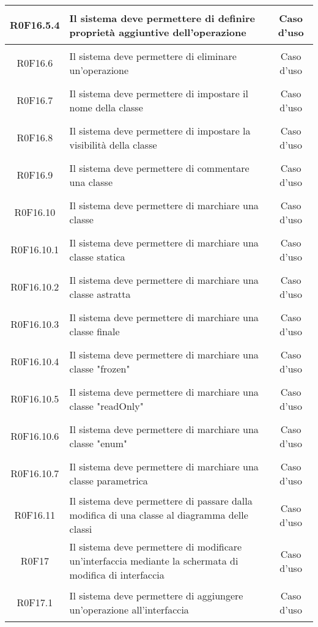 \documentclass[../AnalisiDeiRequisiti.tex]{subfiles}
\begin{document}
\begin{longtable}{|c|>{\centering}p{7cm}|c|}
	\hypertarget{R0F16.5.4}{R0F16.5.4} & Il sistema deve permettere di definire proprietà aggiuntive dell'operazione & Caso d'uso \\ \hline
	\hypertarget{R0F16.6}{R0F16.6} & Il sistema deve permettere di eliminare un'operazione  & Caso d'uso \\ \hline
	\hypertarget{R0F16.7}{R0F16.7} & Il sistema deve permettere di impostare il nome della classe & Caso d'uso \\ \hline
	\hypertarget{R0F16.8}{R0F16.8} & Il sistema deve permettere di impostare la visibilità della classe & Caso d'uso \\ \hline
	\hypertarget{R0F16.9}{R0F16.9} & Il sistema deve permettere di commentare una classe & Caso d'uso \\ \hline
	\hypertarget{R0F16.10}{R0F16.10} & Il sistema deve permettere di marchiare una classe & Caso d'uso \\ \hline
	\hypertarget{R0F16.10.1}{R0F16.10.1} & Il sistema deve permettere di marchiare una classe statica & Caso d'uso \\ \hline
	\hypertarget{R0F16.10.2}{R0F16.10.2} & Il sistema deve permettere di marchiare una classe astratta & Caso d'uso \\ \hline
	\hypertarget{R0F16.10.3}{R0F16.10.3} & Il sistema deve permettere di marchiare una classe finale & Caso d'uso \\ \hline
	\hypertarget{R0F16.10.4}{R0F16.10.4} & Il sistema deve permettere di marchiare una classe "frozen" & Caso d'uso \\ \hline
	\hypertarget{R0F16.10.5}{R0F16.10.5} & Il sistema deve permettere di marchiare una classe "readOnly" & Caso d'uso \\ \hline
	\hypertarget{R0F16.10.6}{R0F16.10.6} & Il sistema deve permettere di marchiare una classe "enum" & Caso d'uso \\ \hline
	\hypertarget{R0F16.10.7}{R0F16.10.7} & Il sistema deve permettere di marchiare una classe parametrica & Caso d'uso \\ \hline
	\hypertarget{R0F16.11}{R0F16.11} & Il sistema deve permettere di passare dalla modifica di una classe al diagramma delle classi	 & Caso d'uso \\ \hline
	\hypertarget{R0F17}{R0F17} & Il sistema deve permettere di modificare un'interfaccia mediante la schermata di modifica di interfaccia & Caso d'uso \\ \hline
	\hypertarget{R0F17.1}{R0F17.1} & Il sistema deve permettere di aggiungere un'operazione all'interfaccia & Caso d'uso \\ \hline

\end{longtable}
\end{document}
